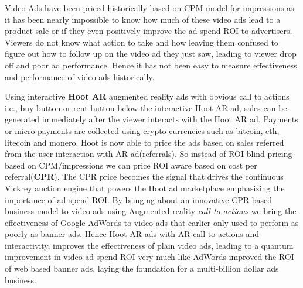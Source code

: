 Video Ads have been priced historically based on CPM model for impressions as it has been nearly impossible to know how much of these video ads lead to a product sale or if they even positively improve the ad-spend ROI to advertisers. Viewers do not know what action to take and how leaving them confused to figure out how to follow up on the video ad they just saw, leading to viewer drop off and poor ad performance. Hence it has not been easy  to measure effectiveness and performance of video ads historically.

Using interactive \textbf{Hoot AR} augmented reality  ads with obvious call to actions i.e., buy button or rent button below the interactive Hoot AR ad, sales can be generated immediately after the viewer interacts with the Hoot AR ad. Payments or micro-payments are collected using crypto-currencies such as bitcoin, eth, litecoin and monero. Hoot is now able to price the ads based on sales referred from the user interaction with AR ad(referrals). So instead of ROI blind pricing based on CPM/impressions we can price ROI aware based on cost per referral(\textbf{CPR}). The CPR price becomes the signal that drives the continuous Vickrey auction engine that powers the Hoot ad marketplace emphasizing the importance of ad-spend ROI. By bringing about an innovative CPR based business model to video ads using Augmented reality \emph{call-to-actions} we bring the effectiveness of Google AdWords to video ads that earlier only used to perform as poorly as banner ads. Hence Hoot AR ads with AR call to actions and interactivity, improves the effectiveness of plain video ads, leading to a quantum improvement in video ad-spend ROI very much like AdWords improved the ROI of web based banner ads, laying the foundation for a multi-billion dollar ads business.
